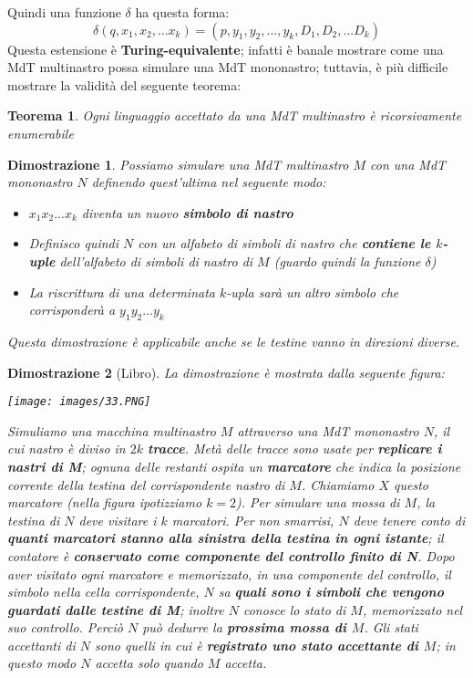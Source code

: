 \documentclass[12pt]{article}
\newtheorem{Teorema}{Teorema}[subsection]
\newtheorem{Dimostrazione}{Dimostrazione}[subsection]
\begin{document}
Quindi una funzione $\delta$ ha questa forma:
$$\delta(q, x_1,x_2,...x_k) = (p, y_1, y_2, ..., y_k, D_1, D_2,...D_k)$$
Questa estensione è \textbf{Turing-equivalente}; infatti è banale mostrare come una MdT multinastro possa simulare una MdT mononastro; tuttavia, è più difficile mostrare la validità del seguente teorema:
\begin{Teorema}
    Ogni linguaggio accettato da una MdT multinastro è ricorsivamente enumerabile
\end{Teorema}
\begin{Dimostrazione}
    Possiamo simulare una MdT multinastro $M$ con una MdT mononastro $N$ definendo quest'ultima nel seguente modo:
    \begin{itemize}
        \item $x_1x_2...x_k$ diventa un nuovo \textbf{simbolo di nastro}
        \item Definisco quindi $N$ con un alfabeto di simboli di nastro che \textbf{contiene le $k$-uple} dell'alfabeto di simboli di nastro di $M$ (guardo quindi la funzione $\delta$)
        \item La riscrittura di una determinata $k$-upla sarà un altro simbolo che corrisponderà a $y_1y_2...y_k$
    \end{itemize}
    Questa dimostrazione è applicabile anche se le testine vanno in direzioni diverse.
\end{Dimostrazione}
\begin{Dimostrazione}[Libro]
    La dimostrazione è mostrata dalla seguente figura:
    \begin{center}
        \texttt{[image: images/33.PNG]}
    \end{center}
    Simuliamo una macchina multinastro $M$ attraverso una MdT mononastro $N$, il cui nastro è diviso in $2k$ \textbf{tracce}. Metà delle tracce sono usate per \textbf{replicare i nastri di M}; ognuna delle restanti ospita un \textbf{marcatore} che indica la posizione corrente della testina del corrispondente nastro di $M$. Chiamiamo $X$ questo marcatore (nella figura ipotizziamo $k = 2$). \newline
    Per simulare una mossa di $M$, la testina di $N$ deve visitare i $k$ marcatori. Per non smarrisi, $N$ deve tenere conto di \textbf{quanti marcatori stanno alla sinistra della testina in ogni istante}; il contatore è \textbf{conservato come componente del controllo finito di N}. Dopo aver visitato ogni marcatore e memorizzato, in una componente del controllo, il simbolo nella cella corrispondente, $N$ sa \textbf{quali sono i simboli che vengono guardati dalle testine di M}; inoltre $N$ conosce lo stato di $M$, memorizzato nel suo controllo. Perciò $N$ può dedurre la \textbf{prossima mossa di $M$}. \newline 
    Gli stati accettanti di $N$ sono quelli in cui è \textbf{registrato uno stato accettante di $M$}; in questo modo $N$ accetta solo quando $M$ accetta.
\end{Dimostrazione}
\end{document}
